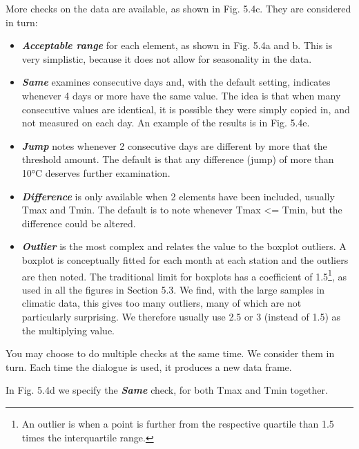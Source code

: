 \documentclass[
  letterpaper,
  DIV=11,
  numbers=noendperiod]{scrreprt}
\begin{document}
More checks on the data are available, as shown in Fig. 5.4c. They are
considered in turn:

\begin{itemize}
\item
  \textbf{\emph{Acceptable range}} for each element, as shown in Fig.
  5.4a and b. This is very simplistic, because it does not allow for
  seasonality in the data.
\item
  \textbf{\emph{Same}} examines consecutive days and, with the default
  setting, indicates whenever 4 days or more have the same value. The
  idea is that when many consecutive values are identical, it is
  possible they were simply copied in, and not measured on each day. An
  example of the results is in Fig. 5.4e.
\item
  \textbf{\emph{Jump}} notes whenever 2 consecutive days are different
  by more that the threshold amount. The default is that any difference
  (jump) of more than 10°C deserves further examination.
\item
  \textbf{\emph{Difference}} is only available when 2 elements have been
  included, usually Tmax and Tmin. The default is to note whenever Tmax
  \textless= Tmin, but the difference could be altered.
\item
  \textbf{\emph{Outlier}} is the most complex and relates the value to
  the boxplot outliers. A boxplot is conceptually fitted for each month
  at each station and the outliers are then noted. The traditional limit
  for boxplots has a coefficient of 1.5\footnote{An outlier is when a
    point is further from the respective quartile than 1.5 times the
    interquartile range.}, as used in all the figures in Section 5.3. We
  find, with the large samples in climatic data, this gives too many
  outliers, many of which are not particularly surprising. We therefore
  usually use 2.5 or 3 (instead of 1.5) as the multiplying value.
\end{itemize}

You may choose to do multiple checks at the same time. We consider them
in turn. Each time the dialogue is used, it produces a new data frame.

In Fig. 5.4d we specify the \textbf{\emph{Same}} check, for both Tmax
and Tmin together.
\end{document}
